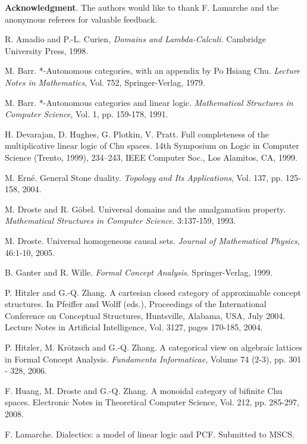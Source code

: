 \documentclass{LMCS}
\begin{document}
\bigskip
{\bf Acknowledgment}. The authors would like to thank F. Lamarche and the anonymous 
referees for valuable feedback.
\begin{thebibliography}{10}


R. Amadio and P.-L. Curien,
\emph{Domains and Lambda-Calculi.} 
Cambridge University Press, 1998. 

 M. Barr. *-Autonomous categories, with an appendix by Po Hsiang Chu. 
{\em  Lecture Notes in Mathematics}, Vol. 752,  Springer-Verlag, 1979. 

 M. Barr. *-Autonomous categories and linear logic. 
{\em Mathematical Structures in Computer Science}, Vol. 1, pp. 159-178, 1991. 

H. Devarajan, D. Hughes, G. Plotkin, V. Pratt. 
Full completeness of the multiplicative linear logic of Chu spaces. 
14th Symposium on Logic in Computer Science (Trento, 1999), 234--243,
IEEE Computer Soc., Los Alamitos, CA, 1999. 


M. Ern\'{e}. General Stone duality. {\em Topology and Its Applications}, Vol. 137, pp. 125-158, 2004. 

M. Droste and R. G\"{o}bel. Universal domains and the amalgamation
property. {\em Mathematical Structures in Computer Science}. 3:137-159,
1993. 

M. Droste. 
Universal homogeneous causal sets. 
{\em Journal of Mathematical Physics},  46:1-10, 2005.


B. Ganter and R. Wille. 
{\em Formal Concept Analysis}. 
Springer-Verlag, 1999. 


P. Hitzler and G.-Q. Zhang. 
A cartesian closed category of approximable concept structures. 
In Pfeiffer and Wolff (eds.), Proceedings of the International Conference on Conceptual Structures,
Huntsville, Alabama, USA, July 2004. Lecture Notes in Artificial Intelligence, Vol. 3127,   pages 170-185, 2004.


P. Hitzler, M. Kr\"{o}tzsch and G.-Q. Zhang. 
A categorical view on algebraic lattices in Formal Concept Analysis. 
{\em Fundamenta Informaticae}, Volume 74 (2-3), pp. 301 - 328, 2006. 

F. Huang, M. Droste and G.-Q. Zhang.
	A monoidal category of bifinite Chu spaces. 
	Electronic Notes in Theoretical Computer Science, Vol. 212, pp. 285-297, 2008.

F. Lamarche. 
Dialectics: a model of linear logic and PCF. Submitted to MSCS.


\end{thebibliography}
\end{document}
